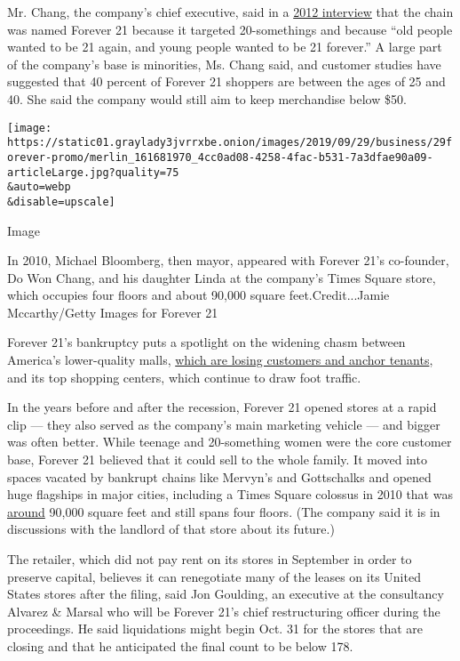 Mr. Chang, the company's chief executive, said in a
\href{http://edition.cnn.com/TRANSCRIPTS/1209/21/ta.01.html}{2012
interview} that the chain was named Forever 21 because it targeted
20-somethings and because ``old people wanted to be 21 again, and young
people wanted to be 21 forever.'' A large part of the company's base is
minorities, Ms. Chang said, and customer studies have suggested that 40
percent of Forever 21 shoppers are between the ages of 25 and 40. She
said the company would still aim to keep merchandise below \$50.

\texttt{[image: https://static01.graylady3jvrrxbe.onion/images/2019/09/29/business/29forever-promo/merlin\_161681970\_4cc0ad08-4258-4fac-b531-7a3dfae90a09-articleLarge.jpg?quality=75\\\&auto=webp\\\&disable=upscale]}

Image

In 2010, Michael Bloomberg, then mayor, appeared with Forever 21's
co-founder, Do Won Chang, and his daughter Linda at the company's Times
Square store, which occupies four floors and about 90,000 square
feet.Credit...Jamie Mccarthy/Getty Images for Forever 21

Forever 21's bankruptcy puts a spotlight on the widening chasm between
America's lower-quality malls,
\href{https://www.nytimes3xbfgragh.onion/2015/01/04/business/the-economics-and-nostalgia-of-dead-malls.html}{which
are losing customers and anchor tenants}, and its top shopping centers,
which continue to draw foot traffic.

In the years before and after the recession, Forever 21 opened stores at
a rapid clip --- they also served as the company's main marketing
vehicle --- and bigger was often better. While teenage and 20-something
women were the core customer base, Forever 21 believed that it could
sell to the whole family. It moved into spaces vacated by bankrupt
chains like Mervyn's and Gottschalks and opened huge flagships in major
cities, including a Times Square colossus in 2010 that was
\href{https://www.wsj.com/articles/SB10001424052748704629804575325121769810944}{around}
90,000 square feet and still spans four floors. (The company said it is
in discussions with the landlord of that store about its future.)

The retailer, which did not pay rent on its stores in September in order
to preserve capital, believes it can renegotiate many of the leases on
its United States stores after the filing, said Jon Goulding, an
executive at the consultancy Alvarez \& Marsal who will be Forever 21's
chief restructuring officer during the proceedings. He said liquidations
might begin Oct. 31 for the stores that are closing and that he
anticipated the final count to be below 178.

